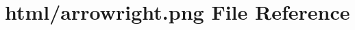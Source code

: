 \hypertarget{arrowright_8png}{}\section{html/arrowright.png File Reference}
\label{arrowright_8png}
